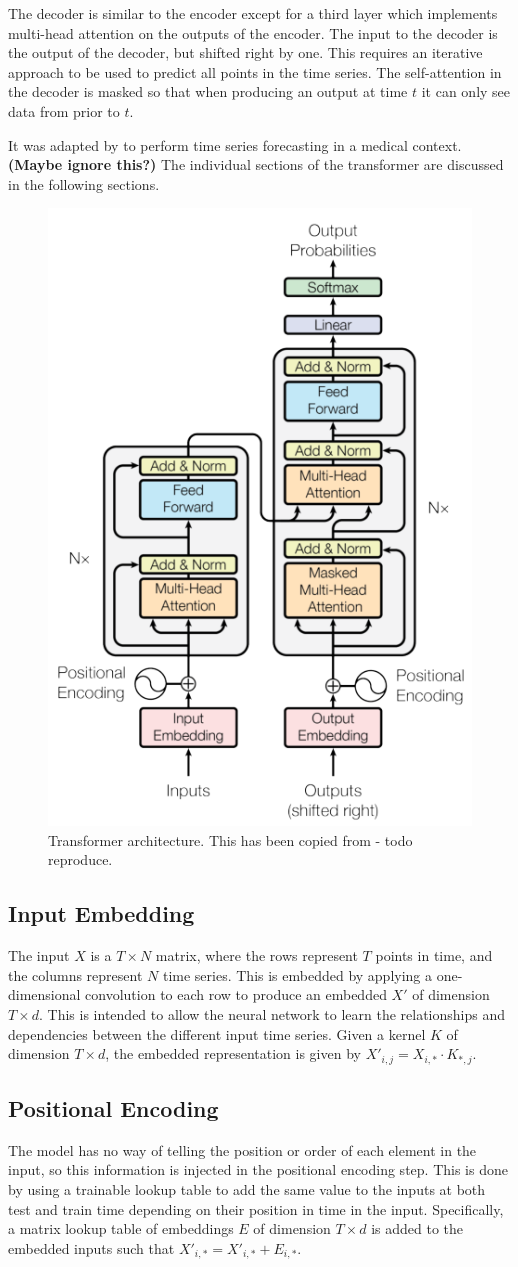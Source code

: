 \documentclass[conference]{IEEEtran}
\begin{document}
The decoder is similar to the encoder except for a third layer which implements multi-head attention on the outputs of the encoder.
The input to the decoder is the output of the decoder, but shifted right by one.
This requires an iterative approach to be used to predict all points in the time series.
The self-attention in the decoder is masked so that when producing an output at time $t$ it can only see data from prior to $t$.

It was adapted by \cite{Song2017} to perform time series forecasting in a medical context. \textbf{(Maybe ignore this?)}
The individual sections of the transformer are discussed in the following sections.

\begin{figure}[htbp]
	\centerline{\includegraphics[width=.35\textwidth]{images/transformer_vaswani_copied.png}}
	\caption{Transformer architecture. This has been copied from \cite{Vaswani2017} - todo reproduce.}
	\label{fig:transformer}
\end{figure}

\subsection{Input Embedding}
The input $X$ is a $T \times N$ matrix, where the rows represent $T$ points in time, and the columns represent $N$ time series.
This is embedded by applying a one-dimensional convolution to each row to produce an embedded $X'$ of dimension $T \times d$.
This is intended to allow the neural network to learn the relationships and dependencies between the different input time series.
Given a kernel $K$ of dimension $T \times d$, the embedded representation is given by $X'_{i, j} = X_{i,*} \cdot K_{*, j}$.

\subsection{Positional Encoding}
The model has no way of telling the position or order of each element in the input, so this information is injected in the positional encoding step.
This is done by using a trainable lookup table to add the same value to the inputs at both test and train time depending on their position in time in the input.
Specifically, a matrix lookup table of embeddings $E$ of dimension $T \times d$ is added to the embedded inputs such that $X'_{i,*} = X'_{i,*} + E_{i,*}$.
\end{document}
